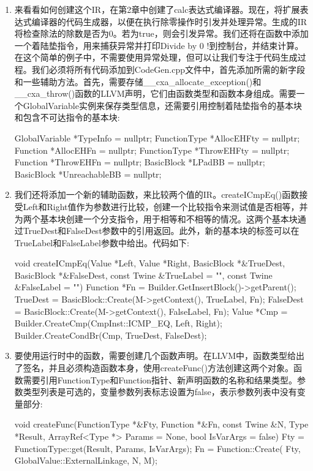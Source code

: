 \begin{enumerate}
\item
来看看如何创建这个IR，在第2章中创建了calc表达式编译器。现在，将扩展表达式编译器的代码生成器，以便在执行除零操作时引发并处理异常。生成的IR将检查除法的除数是否为0。若为true，则会引发异常。我们还将在函数中添加一个着陆垫指令，用来捕获异常并打印Divide by 0 !到控制台，并结束计算。在这个简单的例子中，不需要使用异常处理，但可以让我们专注于代码生成过程。我们必须将所有代码添加到CodeGen.cpp文件中，首先添加所需的新字段和一些辅助方法。首先，需要存储\_\_cxa\_allocate\_exception()和\_\_cxa\_throw()函数的LLVM声明，它们由函数类型和函数本身组成。需要一个GlobalVariable实例来保存类型信息，还需要引用控制着陆垫指令的基本块和包含不可达指令的基本块:

\begin{cpp}
GlobalVariable *TypeInfo = nullptr;
FunctionType *AllocEHFty = nullptr;
Function *AllocEHFn = nullptr;
FunctionType *ThrowEHFty = nullptr;
Function *ThrowEHFn = nullptr;
BasicBlock *LPadBB = nullptr;
BasicBlock *UnreachableBB = nullptr;
\end{cpp}

\item
我们还将添加一个新的辅助函数，来比较两个值的IR。createICmpEq()函数接受Left和Right值作为参数进行比较，创建一个比较指令来测试值是否相等，并为两个基本块创建一个分支指令，用于相等和不相等的情况。这两个基本块通过TrueDest和FalseDest参数中的引用返回。此外，新的基本块的标签可以在TrueLabel和FalseLabel参数中给出。代码如下:

\begin{cpp}
void createICmpEq(Value *Left, Value *Right,
                    BasicBlock *&TrueDest,
                    BasicBlock *&FalseDest,
                    const Twine &TrueLabel = "",
                    const Twine &FalseLabel = "") {
    Function *Fn =
        Builder.GetInsertBlock()->getParent();
    TrueDest = BasicBlock::Create(M->getContext(),
                                    TrueLabel, Fn);
    FalseDest = BasicBlock::Create(M->getContext(),
                                    FalseLabel, Fn);
    Value *Cmp = Builder.CreateCmp(CmpInst::ICMP_EQ,
                                    Left, Right);
    Builder.CreateCondBr(Cmp, TrueDest, FalseDest);
}
\end{cpp}

\item
要使用运行时中的函数，需要创建几个函数声明。在LLVM中，函数类型给出了签名，并且必须构造函数本身，使用createFunc()方法创建这两个对象。函数需要引用FunctionType和Function指针、新声明函数的名称和结果类型。参数类型列表是可选的，变量参数列表标志设置为false，表示参数列表中没有变量部分:

\begin{cpp}
void createFunc(FunctionType *&Fty, Function *&Fn,
                const Twine &N, Type *Result,
                ArrayRef<Type *> Params = None,
                bool IsVarArgs = false) {
    Fty = FunctionType::get(Result, Params, IsVarArgs);
    Fn = Function::Create(
        Fty, GlobalValue::ExternalLinkage, N, M);
}
\end{cpp}
\end{enumerate}

